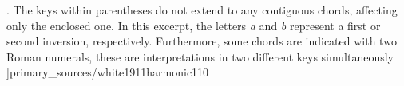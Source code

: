 \phdfigure[Notation for key fluctuations, in parentheses,
appearing in \textcite[p.~110]{white1911harmonic}. The keys
within parentheses do not extend to any contiguous chords,
affecting only the enclosed one. In this excerpt, the
letters \emph{a} and \emph{b} represent a first or second
inversion, respectively. Furthermore, some chords are
indicated with two Roman numerals, these are interpretations
in two different keys simultaneously
]{primary_sources/white1911harmonic110}









